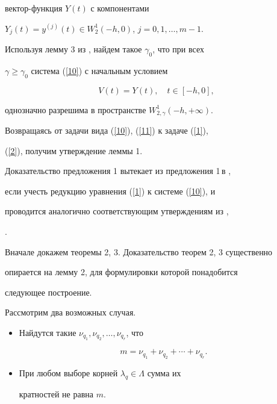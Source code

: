 вектор-функция $Y(t)$ с компонентами 


$Y_j(t)=y^{(j)}(t)\in W^1_2(-h,0)$, $j=0,1,\dotsc,m-1$. 


 


Используя лемму 3 из \cite{1}, найдем такое $\gamma_0$, что при всех 


$\gamma\ge \gamma_0$ система (\ref{10}) с начальным условием 


\begin{equation} 


\label{11} 


V(t)=Y(t),\quad t\in[-h,0], 


\end{equation} 


однозначно разрешима в пространстве $W^1_{2,\gamma}(-h,+\infty)$. 


 


Возвращаясь от задачи вида (\ref{10}), (\ref{11}) к задаче (\ref{1}), 


(\ref{2}), получим утверждение леммы 1. 


 


Доказательство предложения 1 вытекает из предложения 1\,в \cite{1}, 


если учесть редукцию уравнения (\ref{1}) к системе (\ref{10}), и 


проводится аналогично соответствующим утверждениям из \cite{5},


\cite{6}. 


 


Вначале докажем теоремы 2, 3. Доказательство теорем 2, 3 существенно 


опирается на лемму 2, для формулировки которой понадобится 


следующее построение. 


 


Рассмотрим два возможных случая. 


\begin{itemize} 


\item[(C1)] Найдутся такие $\nu_{q_1},\nu_{q_2},\dotsc,\nu_{q_r}$, что 


$$ 


m=\nu_{q_1}+\nu_{q_2}+\dotsb+\nu_{q_r}. 


$$ 


\item[(C2)] При любом выборе корней $\lambda_q\in\Lambda$ сумма их 


кратностей не равна $m$. 


\end{itemize} 


